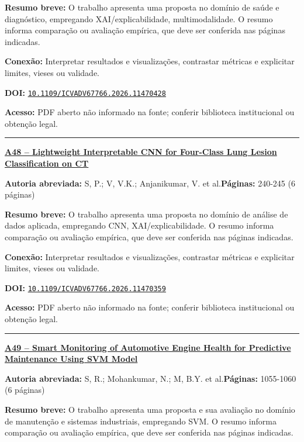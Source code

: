 \documentclass[10pt,a4paper]{article}
\begin{document}
\textbf{Resumo breve:} O trabalho apresenta uma proposta no domínio de saúde e diagnóstico, empregando XAI/explicabilidade, multimodalidade. O resumo informa comparação ou avaliação empírica, que deve ser conferida nas páginas indicadas.\par
\textbf{Conexão:} Interpretar resultados e visualizações, contrastar métricas e explicitar limites, vieses ou validade.\par
\textbf{DOI:} \href{https://doi.org/10.1109/ICVADV67766.2026.11470428}{\nolinkurl{10.1109/ICVADV67766.2026.11470428}}\par
\textbf{Acesso:} PDF aberto não informado na fonte; conferir biblioteca institucional ou obtenção legal.\par
\noindent\rule{\textwidth}{0.35pt}
\par\medskip\noindent
{\large\bfseries\href{https://doi.org/10.1109/ICVADV67766.2026.11470359}{A48 -- Lightweight Interpretable CNN for Four-Class Lung Lesion Classification on CT}}\par\smallskip
\textbf{Autoria abreviada:} S, P.; V, V.K.; Anjanikumar, V. et al.\quad \textbf{Páginas:} 240-245 (6 páginas)\par
\textbf{Resumo breve:} O trabalho apresenta uma proposta no domínio de análise de dados aplicada, empregando CNN, XAI/explicabilidade. O resumo informa comparação ou avaliação empírica, que deve ser conferida nas páginas indicadas.\par
\textbf{Conexão:} Interpretar resultados e visualizações, contrastar métricas e explicitar limites, vieses ou validade.\par
\textbf{DOI:} \href{https://doi.org/10.1109/ICVADV67766.2026.11470359}{\nolinkurl{10.1109/ICVADV67766.2026.11470359}}\par
\textbf{Acesso:} PDF aberto não informado na fonte; conferir biblioteca institucional ou obtenção legal.\par
\noindent\rule{\textwidth}{0.35pt}
\par\medskip\noindent
{\large\bfseries\href{https://doi.org/10.1109/ICVADV67766.2026.11470324}{A49 -- Smart Monitoring of Automotive Engine Health for Predictive Maintenance Using SVM Model}}\par\smallskip
\textbf{Autoria abreviada:} S, R.; Mohankumar, N.; M, B.Y. et al.\quad \textbf{Páginas:} 1055-1060 (6 páginas)\par
\textbf{Resumo breve:} O trabalho apresenta uma proposta e sua avaliação no domínio de manutenção e sistemas industriais, empregando SVM. O resumo informa comparação ou avaliação empírica, que deve ser conferida nas páginas indicadas.\par
\end{document}
